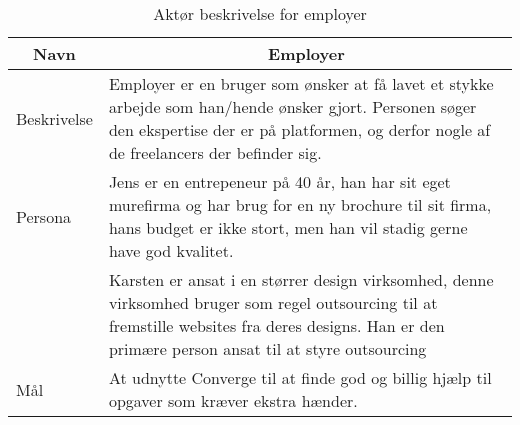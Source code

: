 \begin{table}[H]
    \begin{small}
        \caption{Aktør beskrivelse for employer}
        \label{tab:employer}
        \begin{center}
            \begin{tabular}[c]{p{3cm}|p{8cm}}
                \multicolumn{1}{c|}{\textbf{Navn}} & \multicolumn{1}{c}{\textbf{Employer}}                                                                                                                                                                                           \\
                \hline
                Beskrivelse                        & \multicolumn{1}{p{10cm}}{Employer er en bruger som ønsker at få lavet et stykke arbejde som han/hende ønsker gjort. Personen søger den ekspertise der er på platformen, og derfor nogle af de freelancers der befinder sig.}    \\
                \hline
                Persona                            & \multicolumn{1}{p{10cm}}{Jens er en entrepeneur på 40 år, han har sit eget murefirma og har brug for en ny brochure til sit firma, hans budget er ikke stort, men han vil stadig gerne have god kvalitet.}                      \\
                                                   & \multicolumn{1}{p{10cm}}{Karsten er ansat i en størrer design virksomhed, denne virksomhed bruger som regel outsourcing til at fremstille websites fra deres designs. Han er den primære person ansat til at styre outsourcing} \\
                \hline
                Mål                                & \multicolumn{1}{p{10cm}}{At udnytte Converge til at finde god og billig hjælp til opgaver som kræver ekstra hænder.}                                                                                                            \\
            \end{tabular}
        \end{center}
    \end{small}
\end{table}

